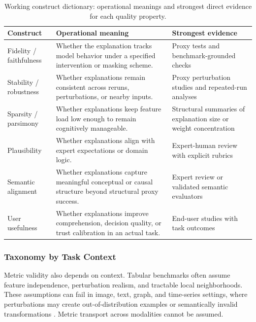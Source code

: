 \documentclass[fleqn,10pt,lineno]{wlpeerj}
\begin{document}
\begin{table}[t]
\centering
\caption{Working construct dictionary: operational meanings and strongest
direct evidence for each quality property.}
\begin{tabularx}{\linewidth}{l X X}
\toprule
\textbf{Construct} & \textbf{Operational meaning} & \textbf{Strongest evidence} \\
\midrule
Fidelity / faithfulness & Whether the explanation tracks model behavior under a specified intervention or masking scheme. & Proxy tests and benchmark-grounded checks \\
Stability / robustness & Whether explanations remain consistent across reruns, perturbations, or nearby inputs. & Proxy perturbation studies and repeated-run analyses \\
Sparsity / parsimony & Whether explanations keep feature load low enough to remain cognitively manageable. & Structural summaries of explanation size or weight concentration \\
Plausibility & Whether explanations align with expert expectations or domain logic. & Expert-human review with explicit rubrics \\
Semantic alignment & Whether explanations capture meaningful conceptual or causal structure beyond structural proxy success. & Expert review or validated semantic evaluators \\
User usefulness & Whether explanations improve comprehension, decision quality, or trust calibration in an actual task. & End-user studies with task outcomes \\
\bottomrule
\end{tabularx}
\label{tab:constructs}
\end{table}

\subsubsection{Taxonomy by Task Context}

Metric validity also depends on context. Tabular benchmarks often assume
feature independence, perturbation realism, and tractable local
neighborhoods. These assumptions can fail in image, text, graph, and
time-series settings, where perturbations may create out-of-distribution
examples or semantically invalid transformations
\citep{agarwal2023gnn_eval,proszewska2025bxaic}. Metric transport across
modalities cannot be assumed.
\end{document}
